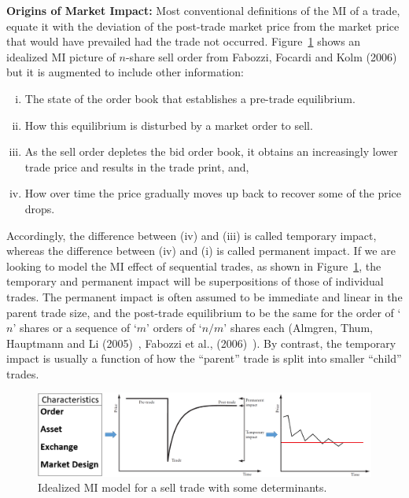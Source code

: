 \noindent\textbf{Origins of Market Impact:} \label{in:permimp} Most conventional definitions of the MI of a trade, equate it with the deviation of the post-trade market price from the market price that would have prevailed had the trade not occurred. Figure~\ref{fig:marketimpt} shows an idealized MI picture of $n$-share sell order from Fabozzi, Focardi and Kolm (2006)~\cite{ffk} but it is augmented to include other information:
	\begin{enumerate}[(i)]
	\item The state of the order book that establishes a pre-trade equilibrium.
	\item How this equilibrium is disturbed by a market order to sell.
	\item As the sell order depletes the bid order book, it obtains an increasingly lower trade price and results in the trade print, and, 
	\item How over time the price gradually moves up back to recover some of the price drops.
	\end{enumerate}
Accordingly, the difference between (iv) and (iii) is called temporary impact, whereas the difference between (iv) and (i) is called permanent impact. If we are looking to model the MI effect of sequential trades, as shown in Figure~\ref{fig:marketimpt}, the temporary and permanent impact will be superpositions of those of individual trades. The permanent impact is often assumed to be immediate and linear in the parent trade size, and the post-trade equilibrium to be the same for the order of `$n$' shares or a sequence of `$m$' orders of `$n/m$' shares each (Almgren, Thum, Hauptmann and Li (2005)~\cite{athl}, Fabozzi et al., (2006)~\cite{ffk}). By contrast, the temporary impact is usually a function of how the ``parent'' trade is split into smaller ``child'' trades.\label{in:tempimpact}


	\begin{figure}[!ht]
	\centering
	\includegraphics[width=\textwidth]{chapters/chapter_mi_models/figures/char_oaem.png}
	\caption{Idealized MI model for a sell trade with some determinants.\label{fig:marketimpt}}
	\end{figure}


